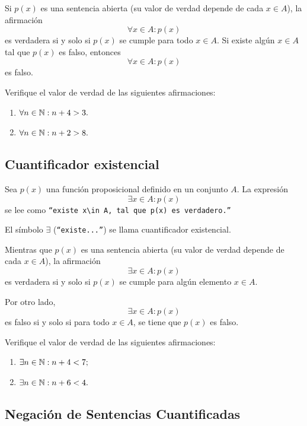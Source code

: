  Si $p(x)$ es una sentencia abierta (su valor de verdad depende de cada $x\in A$), la afirmación
 $$\forall x\in A: p(x)$$ es verdadera si y solo si $p(x)$ se cumple para todo $x\in A.$  Si existe algún $x\in A$ tal que $p(x)$ es falso, entonces $$\forall x\in A: p(x)$$ es falso.



 \begin{resuelto}
  \label{lip:exmp:4.8}
  Verifique el valor de verdad de las siguientes afirmaciones:
  \begin{enumerate}
   \item $\forall n \in \mathbb{N}: n+4>3.$
   \item $\forall n \in \mathbb{N}: n+2>8.$
  \end{enumerate}

 \end{resuelto}



\subsection{Cuantificador existencial}


 Sea $p(x)$ una función proposicional definido en un conjunto $A.$ La expresión
 \[
 \label{lip:4.3}
   \exists x \in A: p(x)
 \]
 se lee como  \texttt{``existe $x\in A,$ tal que $p(x)$ es verdadero.''}

 El símbolo $\exists$ (\texttt{``existe...''}) se llama cuantificador existencial.




 Mientras que $p(x)$ es una sentencia abierta (su valor de verdad depende de cada $x\in A$), la afirmación
 $$\exists x\in A: p(x)$$ es verdadera si y solo si $p(x)$ se cumple para algún elemento $x\in A.$



 Por otro lado,  $$\exists x\in A: p(x)$$ es falso si y solo si para todo $ x\in A $, se tiene que $ p(x) $ es falso.



 Verifique el valor de verdad de las siguientes afirmaciones:
 \begin{enumerate}
  \item $\exists n  \in \mathbb{N}: n+4<7;$
  \item $\exists n \in \mathbb{N}: n+6<4.$
 \end{enumerate}



\subsection{Negación de Sentencias Cuantificadas}



